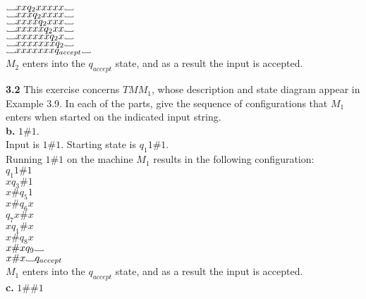\documentclass[12pt]{article}
\newcommand\Vtextvisiblespace[1][.8em]{%
	\mbox{\kern.07em\vrule height.3ex}%
	\vbox{\hrule width#1}%
	\hbox{\vrule height.3ex}}
\begin{document}
$\Vtextvisiblespace xx        q_2 xxxxx   \Vtextvisiblespace  $  \\
$\Vtextvisiblespace xxx       q_2 xxxx    \Vtextvisiblespace  $  \\
$\Vtextvisiblespace xxxx      q_2 xxx     \Vtextvisiblespace  $  \\
$\Vtextvisiblespace xxxxx     q_2 xx      \Vtextvisiblespace  $  \\
$\Vtextvisiblespace xxxxxx    q_2 x       \Vtextvisiblespace  $  \\
$\Vtextvisiblespace xxxxxxx   q_2         \Vtextvisiblespace  $  \\
$\Vtextvisiblespace xxxxxxx   q_{accept}  \Vtextvisiblespace  $  \\
$M_2$ enters into the $q_{accept}$ state, and as a result the input is accepted. \\

\pagebreak

\textbf{3.2} This exercise concerns $TM M_1$, whose description and state diagram appear in 
Example 3.9. In each of the parts, give the sequence of configurations that $M_1$ 
enters when started on the indicated input string. \\

\textbf{b.} $1\#1$. \\

Input is $1\#1$. Starting state is $q_1 1\#1$. \\
Running $1\#1$ on the machine $M_1$ results in the following configuration: \\

$       q_1 1 \# 1  $ \\
$x      q_3 \# 1    $ \\
$x \#   q_5 1       $ \\
$x \#   q_6 x       $ \\
$       q_7 x \# x  $ \\
$x      q_1 \# x    $ \\
$x \#   q_8 x       $ \\
$x \# x q_9 \Vtextvisiblespace $ \\
$x \# x \Vtextvisiblespace q_{accept} $ \\
$M_1$ enters into the $q_{accept}$ state, and as a result the input is accepted. \\

\textbf{c.} $1\#\#1$ \\
\end{document}
